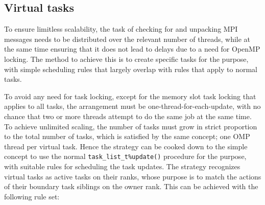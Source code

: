 \documentclass[paper=a4,fontsize=11pt]{scrartcl}
\numberwithin{equation}{section}		%
\numberwithin{figure}{section}			%
\numberwithin{table}{section}				%
\newcommand{\codecolor}{\color{Blue}}
\newcommand{\Code}[1]{{\codecolor\texttt{#1}}}
\begin{document}
\subsection{Virtual tasks}
To ensure limitless scalability, the task of checking for and unpacking MPI messages needs to be distributed over the relevant number of threads, while at the same time ensuring that it does not lead to delays due to a need for OpenMP locking.  The method to achieve this is to create specific tasks for the purpose, with simple scheduling rules that largely overlap with rules that apply to normal tasks.

To avoid any need for task locking, except for the memory slot task locking that applies to all tasks, the arrangement must be one-thread-for-each-update, with no chance that two or more threads attempt to do the same job at the same time.  To achieve unlimited scaling, the number of tasks must grow in strict proportion to the total number of tasks, which is satisfied by the same concept; one OMP thread per virtual task.  Hence the strategy can be cooked down to the simple concept to use the normal \Code{task\_list\_t\%update()} procedure for the purpose, with suitable rules for scheduling the task updates.   The strategy recognizes virtual tasks as active tasks on their ranks, whose purpose is to match the actions of their boundary task siblings on the owner rank.  This can be achieved with the following rule set:
\end{document}
